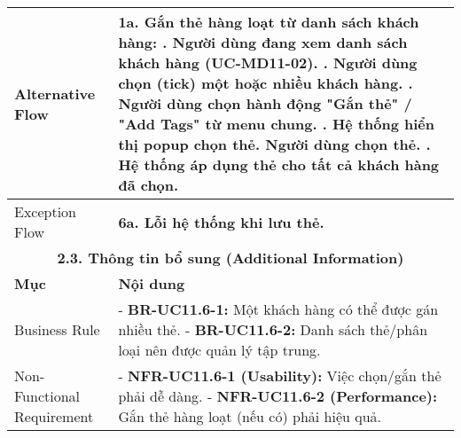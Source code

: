 \begin{longtable}{|m{4cm}|p{11cm}|}
\hline
Alternative Flow & \textbf{1a. Gắn thẻ hàng loạt từ danh sách khách hàng:} \newline    1. Người dùng đang xem danh sách khách hàng (UC-MD11-02). \newline    2. Người dùng chọn (tick) một hoặc nhiều khách hàng. \newline    3. Người dùng chọn hành động "Gắn thẻ" / "Add Tags" từ menu chung. \newline    4. Hệ thống hiển thị popup chọn thẻ. Người dùng chọn thẻ. \newline    5. Hệ thống áp dụng thẻ cho tất cả khách hàng đã chọn. \\
\hline
Exception Flow & \textbf{6a. Lỗi hệ thống khi lưu thẻ.} \\
\hline
\multicolumn{2}{|c|}{\textbf{2.3. Thông tin bổ sung (Additional Information)}} \\
\hline
\textbf{Mục} & \textbf{Nội dung} \\
\hline
Business Rule & - \textbf{BR-UC11.6-1:} Một khách hàng có thể được gán nhiều thẻ. \newline - \textbf{BR-UC11.6-2:} Danh sách thẻ/phân loại nên được quản lý tập trung. \\
\hline
Non-Functional Requirement & - \textbf{NFR-UC11.6-1 (Usability):} Việc chọn/gắn thẻ phải dễ dàng. \newline - \textbf{NFR-UC11.6-2 (Performance):} Gắn thẻ hàng loạt (nếu có) phải hiệu quả. \\
\hline
\end{longtable}


